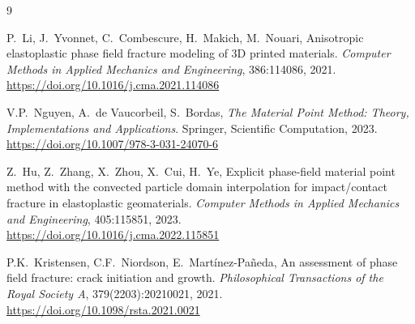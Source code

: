 \documentclass[12pt,a4paper]{article}
\begin{document}
	\begin{thebibliography}{9}

	P.\ Li, J.\ Yvonnet, C.\ Combescure, H.\ Makich, M.\ Nouari,
	Anisotropic elastoplastic phase field fracture modeling of 3D printed materials.
	\textit{Computer Methods in Applied Mechanics and Engineering}, 386:114086, 2021.\\
	\href{https://doi.org/10.1016/j.cma.2021.114086}{https://doi.org/10.1016/j.cma.2021.114086}

	V.P.\ Nguyen, A.\ de Vaucorbeil, S.\ Bordas,
	\textit{The Material Point Method: Theory, Implementations and Applications}.
	Springer, Scientific Computation, 2023.\\
	\href{https://doi.org/10.1007/978-3-031-24070-6}{https://doi.org/10.1007/978-3-031-24070-6}

	Z.\ Hu, Z.\ Zhang, X.\ Zhou, X.\ Cui, H.\ Ye,
	Explicit phase-field material point method with the convected particle domain interpolation for impact/contact fracture in elastoplastic geomaterials.
	\textit{Computer Methods in Applied Mechanics and Engineering}, 405:115851, 2023.\\
	\href{https://doi.org/10.1016/j.cma.2022.115851}{https://doi.org/10.1016/j.cma.2022.115851}

	P.K.\ Kristensen, C.F.\ Niordson, E.\ Mart\'inez-Pa\~neda,
	An assessment of phase field fracture: crack initiation and growth.
	\textit{Philosophical Transactions of the Royal Society A}, 379(2203):20210021, 2021.\\
	\href{https://doi.org/10.1098/rsta.2021.0021}{https://doi.org/10.1098/rsta.2021.0021}

	\end{thebibliography}
\end{document}
